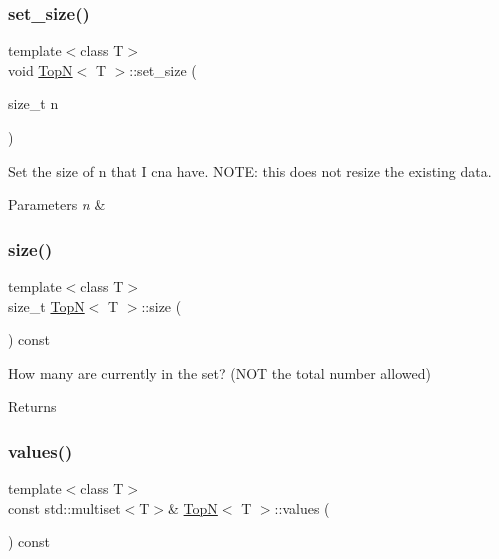 \subsubsection{\texorpdfstring{set\+\_\+size()}{set\_size()}}
{\footnotesize\ttfamily template$<$class T$>$ \\
void \hyperlink{class_top_n}{TopN}$<$ T $>$\+::set\+\_\+size (\begin{DoxyParamCaption}\item[{size\+\_\+t}]{n }\end{DoxyParamCaption})\hspace{0.3cm}{\ttfamily [inline]}}

Set the size of n that I cna have. N\+O\+TE\+: this does not resize the existing data. 
\begin{DoxyParams}{Parameters}
{\em n} & \\
\hline
\end{DoxyParams}
\mbox{\label{class_top_n_ae32d3e10d1571af34f84f32f5ca78fff}} 
\subsubsection{\texorpdfstring{size()}{size()}}
{\footnotesize\ttfamily template$<$class T$>$ \\
size\+\_\+t \hyperlink{class_top_n}{TopN}$<$ T $>$\+::size (\begin{DoxyParamCaption}{ }\end{DoxyParamCaption}) const\hspace{0.3cm}{\ttfamily [inline]}}

How many are currently in the set? (N\+OT the total number allowed) \begin{DoxyReturn}{Returns}

\end{DoxyReturn}
\mbox{\label{class_top_n_a50b05f8d4580c4652e8c1f6770943adc}} 
\subsubsection{\texorpdfstring{values()}{values()}}
{\footnotesize\ttfamily template$<$class T$>$ \\
const std\+::multiset$<$T$>$\& \hyperlink{class_top_n}{TopN}$<$ T $>$\+::values (\begin{DoxyParamCaption}{ }\end{DoxyParamCaption}) const\hspace{0.3cm}{\ttfamily [inline]}}

